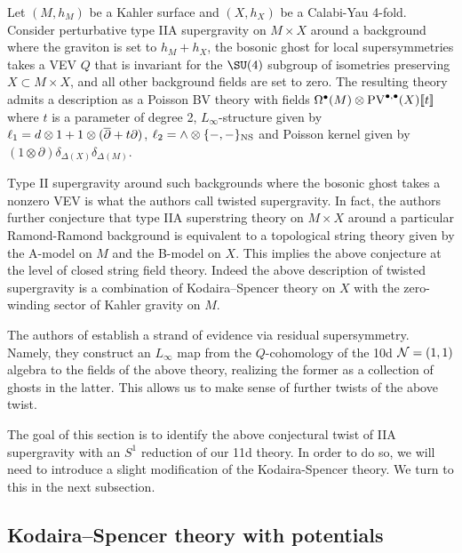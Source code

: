 \documentclass[11pt]{amsart}
\def\pv{{\rm PV}}
\begin{document}
\begin{conj}
  Let $(M,h_{M})$ be a Kahler surface and $(X, h_{X})$ be a Calabi-Yau 4-fold. Consider perturbative type IIA supergravity on $M\times X$ around a background where the graviton is set to $h_{M}+ h_{X}$, the bosonic ghost for local supersymmetries takes a VEV $Q$ that is invariant for the $\SU(4)$ subgroup of isometries preserving $X\subset M\times X$, and all other background fields are set to zero. The resulting theory admits a description as a Poisson BV theory with fields $\Omega^{\bullet}(M)\otimes \pv^{\bullet, \bullet}(X)[\![t]\!]$ where $t$ is a parameter of degree 2, $L_{\infty}$-structure given by $\ell_{1} = d\otimes 1+ 1\otimes (\overline{\partial}+t\partial)$, $\ell_{2} = \wedge\otimes \{-,-\}_{\rm NS}$ and Poisson kernel given by $(1\otimes \partial)\delta_{\Delta(X)}\delta_{\Delta (M)}$.
\end{conj}

Type II supergravity around such backgrounds where the bosonic ghost takes a nonzero VEV is what the authors call twisted supergravity. In fact, the authors further conjecture that type IIA superstring theory on $M\times X$ around a particular Ramond-Ramond background is equivalent to a topological string theory given by the A-model on $M$ and the B-model on $X$. This implies the above conjecture at the level of closed string field theory. Indeed the above description of twisted supergravity is a combination of Kodaira--Spencer theory on $X$ with the zero-winding sector of Kahler gravity on $M$.

The authors of \cite{} establish a strand of evidence via residual supersymmetry. Namely, they construct an $L_{\infty}$ map from the $Q$-cohomology of the 10d $\mathcal N = (1,1)$ algebra to the fields of the above theory, realizing the former as a collection of ghosts in the latter. This allows us to make sense of further twists of the above twist.

The goal of this section is to identify the above conjectural twist of IIA supergravity with an $S^{1}$ reduction of our 11d theory. In order to do so, we will need to introduce a slight modification of the Kodaira-Spencer theory. We turn to this in the next subsection.

\subsection{Kodaira--Spencer theory with potentials}
\label{KSPot}
\end{document}
